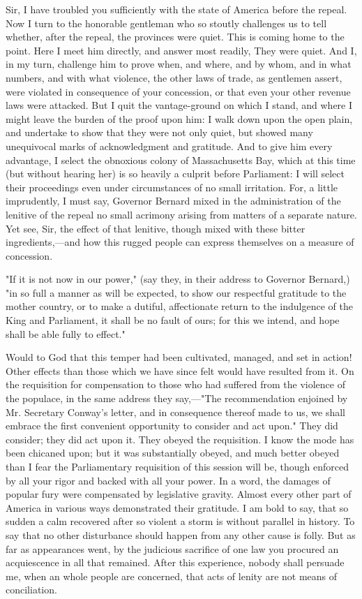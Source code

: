 Sir, I have troubled you sufficiently with the state of America before the repeal. Now I turn to the honorable gentleman who so stoutly challenges us to tell whether, after the repeal, the provinces were quiet. This is coming home to the point. Here I meet him directly, and answer most readily, They were quiet. And I, in my turn, challenge him to prove when, and where, and by whom, and in what numbers, and with what violence, the other laws of trade, as gentlemen assert, were violated in consequence of your concession, or that even your other revenue laws were attacked. But I quit the vantage-ground on which I stand, and where I might leave the burden of the proof upon him: I walk down upon the open plain, and undertake to show that they were not only quiet, but showed many unequivocal marks of acknowledgment and gratitude. And to give him every advantage, I select the obnoxious colony of Massachusetts Bay, which at this time (but without hearing her) is so heavily a culprit before Parliament: I will select their proceedings even under circumstances of no small irritation. For, a little imprudently, I must say, Governor Bernard mixed in the administration of the lenitive of the repeal no small acrimony arising from matters of a separate nature. Yet see, Sir, the effect of that lenitive, though mixed with these bitter ingredients,—and how this rugged people can express themselves on a measure of concession.

"If it is not now in our power," (say they, in their address to Governor Bernard,) "in so full a manner as will be expected, to show our respectful gratitude to the mother country, or to make a dutiful, affectionate return to the indulgence of the King and Parliament, it shall be no fault of ours; for this we intend, and hope shall be able fully to effect."

Would to God that this temper had been cultivated, managed, and set in action! Other effects than those which we have since felt would have resulted from it. On the requisition for compensation to those who had suffered from the violence of the populace, in the same address they say,—"The recommendation enjoined by Mr. Secretary Conway's letter, and in consequence thereof made to us, we shall embrace the first convenient opportunity to consider and act upon." They did consider; they did act upon it. They obeyed the requisition. I know the mode has been chicaned upon; but it was substantially obeyed, and much better obeyed than I fear the Parliamentary requisition of this session will be, though enforced by all your rigor and backed with all your power. In a word, the damages of popular fury were compensated by legislative gravity. Almost every other part of America in various ways demonstrated their gratitude. I am bold to say, that so sudden a calm recovered after so violent a storm is without parallel in history. To say that no other disturbance should happen from any other cause is folly. But as far as appearances went, by the judicious sacrifice of one law you procured an acquiescence in all that remained. After this experience, nobody shall persuade me, when an whole people are concerned, that acts of lenity are not means of conciliation.

